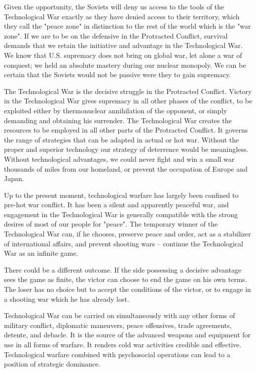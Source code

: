 Given the opportunity, the Soviets will deny us access to the tools of the Technological War exactly as they have denied access to their territory, which they call the "peace zone" in distinction to the rest of the world which is the "war zone". If we are to be on the defensive in the Protracted Conflict, survival demands that we retain the initiative and advantage in the Technological War. We know that U.S. supremacy does not bring on global war, let alone a war of conquest; we held an absolute mastery during our nuclear monopoly. We can be certain that the Soviets would not be passive were they to gain supremacy.

The Technological War is the decisive struggle in the Protracted Conflict. Victory in the Technological War gives supremacy in all other phases of the conflict, to be exploited either by thermonuclear annihilation of the opponent, or simply demanding and obtaining his surrender. The Technological War creates the resources to be employed in all other parts of the Protracted Conflict. It governs the range of strategies that can be adapted in actual or hot war. Without the proper and superior technology our strategy of deterrence would be meaningless. Without technological advantages, we could never fight and win a small war thousands of miles from our homeland, or prevent the occupation of Europe and Japan.

Up to the present moment, technological warfare has largely been confined to pre-hot war conflict. It has been a silent and apparently peaceful war, and engagement in the Technological War is generally compatible with the strong desires of most of our people for "peace". The temporary winner of the Technological War can, if he chooses, preserve peace and order, act as a stabilizer of international affairs, and prevent shooting wars -- continue the Technological War as an infinite game.

There could be a different outcome. If the side possessing a decisive advantage sees the game as finite, the victor can choose to end the game on his own terms. The loser has no choice but to accept the conditions of the victor, or to engage in a shooting war which he has already lost.

Technological War can be carried on simultaneously with any other forms of military conflict, diplomatic maneuvers, peace offensives, trade agreements, detente, and debacle. It is the source of the advanced weapons and equipment for use in all forms of warfare. It renders cold war activities credible and effective. Technological warfare combined with psychosocial operations can lead to a position of strategic dominance.

